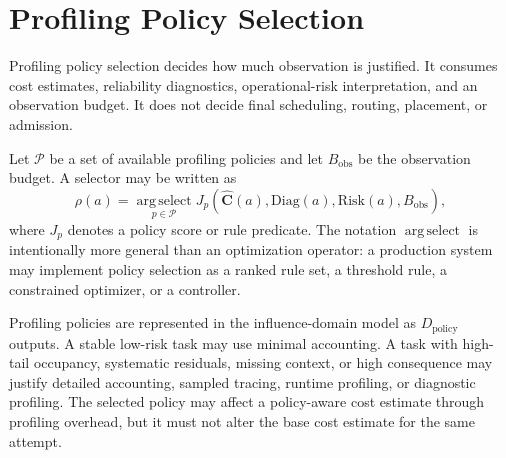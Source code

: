 \section{Profiling Policy Selection}
\label{sec:profiling-policy-selection}

Profiling policy selection decides how much observation is justified. It
consumes cost estimates, reliability diagnostics, operational-risk
interpretation, and an observation budget. It does not decide final scheduling,
routing, placement, or admission.

Let $\mathcal{P}$ be a set of available profiling policies and let
$B_{\mathrm{obs}}$ be the observation budget. A selector may be written as
\[
\rho(a)
=
\operatorname*{arg\,select}_{p\in\mathcal{P}}
J_p\!\left(
\widehat{\mathbf{C}}(a),
\mathrm{Diag}(a),
\mathrm{Risk}(a),
B_{\mathrm{obs}}
\right),
\]
where $J_p$ denotes a policy score or rule predicate. The notation
$\operatorname*{arg\,select}$ is intentionally more general than an
optimization operator: a production system may implement policy selection as a
ranked rule set, a threshold rule, a constrained optimizer, or a controller.

Profiling policies are represented in the influence-domain model as
$D_{\mathrm{policy}}$ outputs. A stable low-risk task may use minimal
accounting. A task with high-tail occupancy, systematic residuals, missing
context, or high consequence may justify detailed accounting, sampled tracing,
runtime profiling, or diagnostic profiling. The selected policy may affect a
policy-aware cost estimate through profiling overhead, but it must not alter the
base cost estimate for the same attempt.
